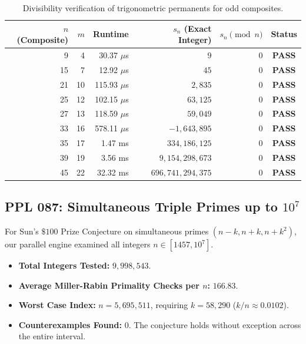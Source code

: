 \documentclass[11pt,a4paper]{article}
\theoremstyle{definition}
\theoremstyle{remark}
\begin{document}
\begin{table}[htbp]
\centering
\small
\caption{Divisibility verification of trigonometric permanents for odd composites.}
\label{tab:trig}
\begin{tabular}{rrrrrc}
\toprule
$n$ (Composite) & $m$ & \textbf{Runtime} & $s_n$ (Exact Integer) & $s_n \pmod n$ & \textbf{Status} \\
\midrule
9  & 4  & 30.37 $\mu$s & $9$                 & 0 & \textbf{PASS} \\
15 & 7  & 12.92 $\mu$s & $45$                & 0 & \textbf{PASS} \\
21 & 10 & 115.93 $\mu$s & $2,835$             & 0 & \textbf{PASS} \\
25 & 12 & 102.15 $\mu$s & $63,125$            & 0 & \textbf{PASS} \\
27 & 13 & 118.59 $\mu$s & $59,049$            & 0 & \textbf{PASS} \\
33 & 16 & 578.11 $\mu$s & $-1,643,895$        & 0 & \textbf{PASS} \\
35 & 17 & 1.47 ms      & $334,186,125$       & 0 & \textbf{PASS} \\
39 & 19 & 3.56 ms      & $9,154,298,673$     & 0 & \textbf{PASS} \\
45 & 22 & 32.32 ms     & $696,741,294,375$   & 0 & \textbf{PASS} \\
\bottomrule
\end{tabular}
\end{table}

\subsection{PPL 087: Simultaneous Triple Primes up to $10^7$}
For Sun's $\$100$ Prize Conjecture on simultaneous primes $(n-k, n+k, n+k^2)$, our parallel engine examined all integers $n \in [1457, 10^7]$.
\begin{itemize}
    \item \textbf{Total Integers Tested:} $9,998,543$.
    \item \textbf{Average Miller-Rabin Primality Checks per $n$:} $166.83$.
    \item \textbf{Worst Case Index:} $n = 5,695,511$, requiring $k = 58,290$ ($k/n \approx 0.0102$).
    \item \textbf{Counterexamples Found:} $0$. The conjecture holds without exception across the entire interval.
\end{itemize}
\end{document}
